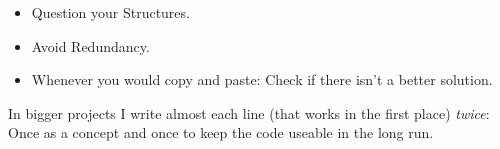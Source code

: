 
\begin{frame}
%
\begin{hintbox}[Conclusion]
\begin{itemize}
\item Question your Structures.
\item Avoid Redundancy.
\item Whenever you would copy and paste: Check if there isn't a better solution.
\end{itemize}

In bigger projects I write almost each line (that works in the first place) \emph{twice}: Once as a concept and once to keep the code useable in the long run.
\end{hintbox}
%
\end{frame}